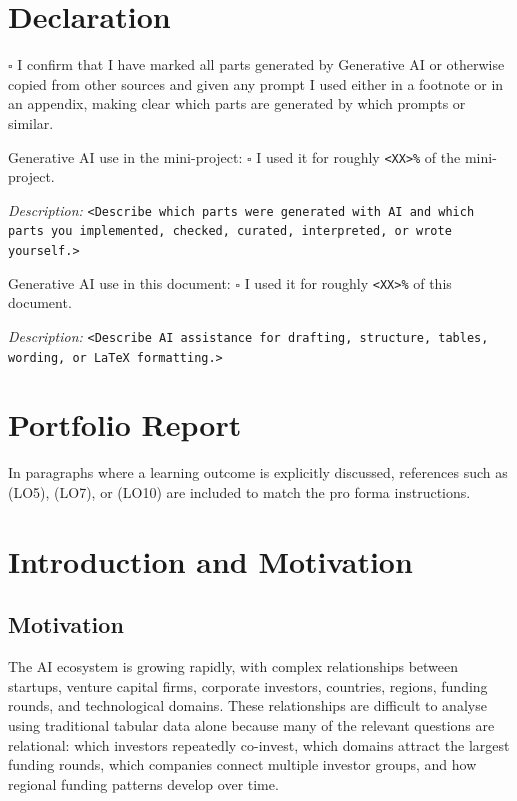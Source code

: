 \documentclass[11pt,a4paper]{article}
\newcommand{\emptybox}{\(\square\)}
\begin{document}
\section*{Declaration}

\emptybox{} I confirm that I have marked all parts generated by Generative AI
or otherwise copied from other sources and given any prompt I used either in a
footnote or in an appendix, making clear which parts are generated by which
prompts or similar.

\vspace{1em}
\noindent
Generative AI use in the mini-project:
\emptybox{} I used it for roughly \texttt{<XX>\%} of the mini-project.

\vspace{0.5em}
\noindent
\textit{Description:} \texttt{<Describe which parts were generated with AI and
which parts you implemented, checked, curated, interpreted, or wrote yourself.>}

\vspace{1em}
\noindent
Generative AI use in this document:
\emptybox{} I used it for roughly \texttt{<XX>\%} of this document.

\vspace{0.5em}
\noindent
\textit{Description:} \texttt{<Describe AI assistance for drafting, structure,
tables, wording, or LaTeX formatting.>}

\newpage
\tableofcontents
\newpage

\section*{Portfolio Report}

In paragraphs where a learning outcome is explicitly discussed, references such
as (LO5), (LO7), or (LO10) are included to match the pro forma instructions.

\section{Introduction and Motivation}
\label{sec:introduction}

\subsection{Motivation}

The AI ecosystem is growing rapidly, with complex relationships between
startups, venture capital firms, corporate investors, countries, regions,
funding rounds, and technological domains. These relationships are difficult to
analyse using traditional tabular data alone because many of the relevant
questions are relational: which investors repeatedly co-invest, which domains
attract the largest funding rounds, which companies connect multiple investor
groups, and how regional funding patterns develop over time.
\end{document}

